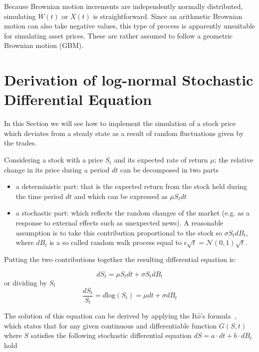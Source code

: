 Because Brownian motion increments are
independently normally distributed, simulating $W(t)$ or $X(t)$ is
straightforward. Since an arithmetic Brownian motion can also take
negative values, this type of process is apparently unsuitable for
simulating asset prices. These are rather assumed to follow a geometric
Brownian motion (GBM). 

\section{Derivation of log-normal Stochastic Differential
	Equation}\label{derivation-of-log-normal-stochastic-differential-equation}

In this Section we will see how to implement the simulation of a stock price which deviates from a steady state as a result of random fluctuations given by the trades. 

Considering a stock with a price \(S_t\) and its expected rate of return \(\mu\); the relative change in its price during a period \(dt\) can be decomposed in two parts

\begin{itemize}
	\tightlist
	\item
	a deterministic part: that is the expected return from the stock held
	during the time period \(dt\) and which can be expressed as \(\mu S_tdt\)
	\item
	a stochastic part: which reflects the random changes of the market
	(e.g. as a response to external effects such as unexpected news). A
	reasonable assumption is to take this contribution proportional to the
	stock so \(\sigma S_t dB_t\), where \(dB_t\) is a so called random walk process equal to \(\epsilon\sqrt{t}=\mathcal{N}(0,1)\sqrt{t}\).
\end{itemize}
Putting the two contributions together the resulting differential equation is:

\begin{equation}
dS_t = \mu S_tdt + \sigma S_tdB_t
\label{eq:differential}
\end{equation}
or dividing by $S_t$
\begin{equation}
\frac{dS_t}{S_t} = d\textrm{log}(S_t) = \mu dt + \sigma dB_t
\end{equation}

The solution of this equation can be derived by applying the
It\(\hat{o}\)'s formula~\cite{bib:ito_lemma}, which states that for any given 
continuous and differentiable function 
\(G(S, t)\) where \(S\) satisfies the following stochastic differential
equation \(dS=a\cdot dt +b\cdot dB_t\) hold

